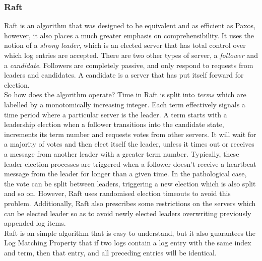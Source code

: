 \documentclass[12pt,a4paper,twoside,openright]{report}
\begin{document}
			\subsubsection*{Raft}
			Raft \cite{Raft} is an algorithm that was designed to be equivalent and as efficient as Paxos, however, it also places a much greater emphasis on comprehensibility.
			It uses the notion of a \textit{strong leader}, which is an elected server that has total control over which log entries are accepted.
			There are two other types of server, a \textit{follower} and a \textit{candidate}. 
			Followers are completely passive, and only respond to requests from leaders and candidates. 
			A candidate is a server that has put itself forward for election.\\

			So how does the algorithm operate? 
			Time in Raft is split into \textit{terms} which are labelled by a monotomically increasing integer. 
			Each term effectively signals a time period where a particular server is the leader. 
			A term starts with a leadership election when a follower transitions into the candidate state, increments its term number and requests votes from other servers. 
			It will wait for a majority of votes and then elect itself the leader, unless it times out or receives a message from another leader with a greater term number. 
			Typically, these leader election processes are triggered when a follower doesn't receive a heartbeat message from the leader for longer than a given time.
			In the pathological case, the vote can be split between leaders, triggering a new election which is also split and so on.
			However, Raft uses randomised election timeouts to avoid this problem.
			Additionally, Raft also prescribes some restrictions on the servers which can be elected leader so as to avoid newly elected leaders overwriting previously appended log items.\\
			
			Raft is an simple algorithm that is easy to understand, but it also guarantees the Log Matching Property that if two logs contain a log entry with the same index and term, then that entry, and all preceding entries will be identical.
\end{document}
